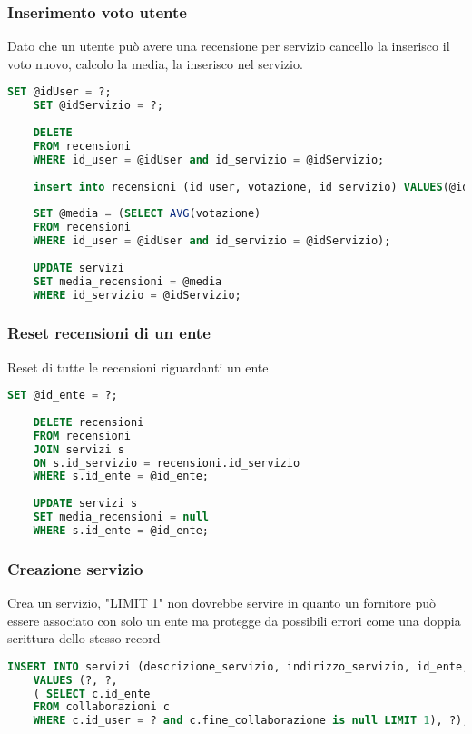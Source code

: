 \subsubsection{Inserimento voto utente}
Dato che un utente può avere una recensione per servizio cancello la inserisco il voto nuovo, calcolo la media, la inserisco nel servizio.
\begin{lstlisting}[language=SQL]
	SET @idUser = ?;
	SET @idServizio = ?;
	
	DELETE 
	FROM recensioni 
	WHERE id_user = @idUser and id_servizio = @idServizio;
	
	insert into recensioni (id_user, votazione, id_servizio) VALUES(@idUser,?,@idServizio);
	
	SET @media = (SELECT AVG(votazione) 
	FROM recensioni 
	WHERE id_user = @idUser and id_servizio = @idServizio);
	
	UPDATE servizi
	SET media_recensioni = @media
	WHERE id_servizio = @idServizio;
\end{lstlisting}



\subsubsection{Reset recensioni di un ente}
Reset di tutte le recensioni riguardanti un ente
\begin{lstlisting}[language=SQL]
	SET @id_ente = ?;
	
	DELETE recensioni 
	FROM recensioni
	JOIN servizi s
	ON s.id_servizio = recensioni.id_servizio
	WHERE s.id_ente = @id_ente;
	
	UPDATE servizi s
	SET media_recensioni = null
	WHERE s.id_ente = @id_ente;
\end{lstlisting}




\subsubsection{Creazione servizio}
Crea un servizio, "LIMIT 1" non dovrebbe servire in quanto un fornitore può essere
associato con solo un ente ma protegge da possibili errori come una doppia scrittura dello stesso record
\begin{lstlisting}[language=SQL]
	INSERT INTO servizi (descrizione_servizio, indirizzo_servizio, id_ente, prezzo_servizio) 
	VALUES (?, ?, 
	( SELECT c.id_ente
	FROM collaborazioni c
	WHERE c.id_user = ? and c.fine_collaborazione is null LIMIT 1), ?);
\end{lstlisting}

